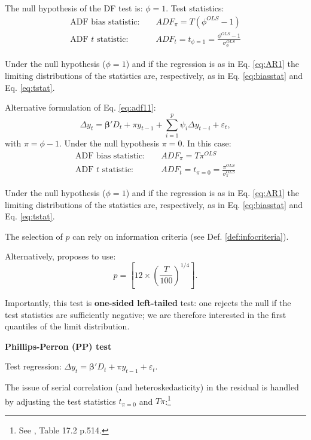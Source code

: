\documentclass[
  12pt,
]{book}
\theoremstyle{definition}
\theoremstyle{definition}
\theoremstyle{definition}
\theoremstyle{definition}
\theoremstyle{remark}
\begin{document}
The null hypothesis of the DF test is: \(\phi=1\). Test statistics:
\begin{eqnarray*}
\mbox{ADF bias statistic: } && ADF_\pi =T(\phi^{OLS}-1)\\
\mbox{ADF $t$ statistic: } && ADF_t = t_{\phi=1} = \frac{\phi^{OLS}-1}{\sigma^{OLS}_{\phi}}
\end{eqnarray*}

Under the null hypothesis (\(\phi=1\)) and if the regression is as in Eq. \eqref{eq:AR1} the limiting distributions of the statistics are, respectively, as in Eq. \eqref{eq:biasstat} and Eq. \eqref{eq:tstat}.

Alternative formulation of Eq. \eqref{eq:adf11}:
\[
\Delta y_t = \boldsymbol\beta' D_t + \pi y_{t-1} + \sum_{i=1}^{p}\psi_i \Delta y_{t-i} + \varepsilon_t,
\]
with \(\pi = \phi - 1\). Under the null hypothesis \(\pi = 0\). In this case:
\begin{eqnarray*}
\mbox{ADF bias statistic: } && ADF_\pi = T\pi^{OLS}\\
\mbox{ADF $t$ statistic: } && ADF_t = t_{\pi=0} = \frac{\pi^{OLS}}{\sigma^{OLS}_{\pi}}
\end{eqnarray*}

Under the null hypothesis (\(\phi=1\)) and if the regression is as in Eq. \eqref{eq:AR1} the limiting distributions of the statistics are, respectively, as in Eq. \eqref{eq:biasstat} and Eq. \eqref{eq:tstat}.

The selection of \(p\) can rely on information criteria (see Def. \ref{def:infocriteria}).

Alternatively, \citet{Schwert_1989} proposes to use:
\[
p=\left[12 \times \left( \frac{T}{100} \right)^{1/4}\right].
\]

Importantly, this test is \textbf{one-sided left-tailed} test: one rejects the null if the test statistics are sufficiently negative; we are therefore interested in the first quantiles of the limit distribution.

\textbf{Phillips-Perron (PP) test}

\citet{Phillips_Perron_1988}

Test regression: \(\Delta y_t = \boldsymbol\beta' D_t + \pi y_{t-1} + \varepsilon_t.\)

The issue of serial correlation (and heteroskedasticity) in the residual is handled by adjusting the test statistics \(t_{\pi=0}\) and \(T\pi\):\footnote{See \citet{Hamilton_1994}, Table 17.2 p.514.}
\end{document}
